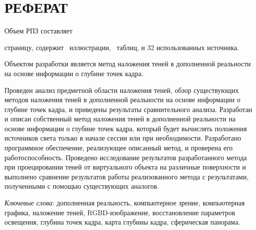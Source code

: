 \chapter*{РЕФЕРАТ}

Объем РПЗ составляет \begin{NoHyper}\pageref{LastPage}\end{NoHyper} страницу, содержит \totfig~иллюстрации, \tottab~таблиц, и 32 использованных источника.

Объектом разработки является метод наложения теней в дополненной реальности на основе информации о глубине точек кадра.

Проведен анализ предметной области наложения теней, обзор существующих методов наложения теней в дополненной реальности на основе информации о глубине точек кадра, и приведены результаты сравнительного анализа. Разработан и описан собственный метод наложения теней в дополненной реальности на основе информации о глубине точек кадра, который будет вычислять положения источников света только в начале сессии или при необходимости. Разработано программное обеспечение, реализующее описанный метод, и проверена его работоспособность. Проведено исследование результатов разработанного метода при проецировании теней от виртуального объекта на различные поверхности и выполнено сравнение результатов работы реализованного метода с результатами, полученными с помощью существующих аналогов.

\textit{Ключевые слова}: дополненная реальность, компьютерное зрение, компьютерная графика, наложение теней, RGBD-изображение, восстановление параметров освещения, глубина точек кадра, карта глубины кадра, сферическая панорама.